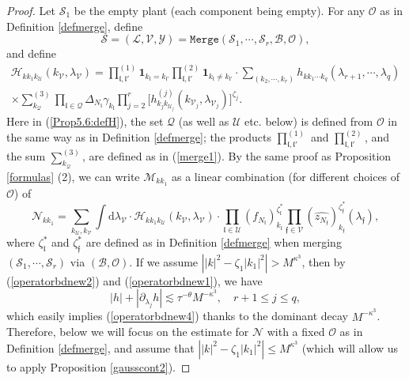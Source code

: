 \documentclass[11 pt,reqno]{amsart}
\theoremstyle{definition}
\theoremstyle{remark}
\numberwithin{equation}{section}
\newcommand{\Sc}{\mathcal{S}}
\newcommand{\Lc}{\mathcal{L}}
\newcommand{\Qc}{\mathcal{Q}}
\newcommand{\Uc}{\mathcal{U}}
\newcommand{\Vc}{\mathcal{V}}
\newcommand{\Yc}{\mathcal{Y}}
\newcommand{\Hc}{\mathcal{H}}
\newcommand{\ff}{\mathfrak{f}}
\newcommand{\lf}{\mathfrak{l}}
\newcommand{\Bs}{\mathscr{B}}
\newcommand{\Ms}{\mathscr{M}}
\newcommand{\Ns}{\mathscr{N}}
\newcommand{\Os}{\mathscr{O}}
\begin{document}
{\begin{proof}
Let $\Sc_1$ be the empty plant (each component being empty). For any $\Os$ as in Definition \ref{defmerge}, define 
\begin{equation*}\Sc=(\Lc,\Vc,\Yc)=\mathtt{Merge}(\Sc_1,\cdots,\Sc_r,\Bs,\Os),\end{equation*} and define
 \begin{multline}\label{Prop5.6:defH}
\Hc_{kk_1k_{\Uc}} (k_{\Vc}, \lambda_{\Vc})=\prod_{\lf,\lf'}^{(1)}\mathbf{1}_{k_\lf=k_{\lf'}}\prod_{\lf,\lf'}^{(2)}\mathbf{1}_{k_\lf\neq k_{\lf'}}\cdot\sum_{(k_2,\cdots,k_{r})}h_{kk_1\cdots k_q}(\lambda_{r+1},\cdots,\lambda_q)\\\times\sum_{k_{\Qc}}^{(3)}\prod_{\lf\in\Qc}\Delta_{N_\lf}\gamma_{k_\lf}\prod_{j=2}^{r}\big[h_{k_jk_{\Uc_j}}^{(j)}(k_{\Vc_j}, \lambda_{\Vc_j})\big]^{\zeta_j}.
\end{multline} Here in (\ref{Prop5.6:defH}), the set $\Qc$ (as well as $\Uc$ etc. below) is defined from $\Os$ in the same way as in Definition \ref{defmerge}; the products $\prod_{\lf,\lf'}^{(1)}$ and $\prod_{\lf,\lf'}^{(2)}$, and the sum $\sum_{k_{\Qc}}^{(3)}$, are defined as in (\ref{merge1}). By the same proof as Proposition \ref{formulas} (2), we can write $\Ms_{kk_1}$ as a linear combination (for different choices of $\Os$) 
of
 \begin{equation}\label{Prop5.6:M}
 \Ns_{kk_1}=\sum_{k_\Uc,k_\Vc}\int\mathrm{d}\lambda_\Vc\cdot \Hc_{kk_1 k_\Uc}(k_\Vc,\lambda_\Vc)\cdot\prod_{\lf\in\Uc}(f_{N_\lf})_{k_\lf}^{\zeta_\lf^*}\prod_{\ff\in\Vc}(\widehat{z_{N_\ff}})_{k_\ff}^{\zeta_\ff^*}(\lambda_\ff),
 \end{equation} 
 where $\zeta_\lf^*$ and $\zeta_\ff^*$ are defined as in Definition \ref{defmerge} when merging $(\Sc_1,\cdots,\Sc_r)$ via $(\Bs,\Os)$. If we assume $\left||k|^2-\zeta_1|k_1|^2\right|> M^{\kappa^3}$, then by (\ref{operatorbdnew2}) and (\ref{operatorbdnew1}), we have 
\[
|h|+|\partial_{\lambda_j} h|\lesssim \tau^{-\theta} M^{-\kappa^3}, \quad r+1\leq j\leq q,
\]
which easily implies (\ref{operatorbdnew4}) thanks to the dominant decay $M^{-\kappa^3}$. Therefore, below we will focus on the estimate for $\Ns$ with a fixed $\Os$ as in Definition \ref{defmerge}, and assume that $\left||k|^2-\zeta_1|k_1|^2\right|\leq M^{\kappa^3}$ (which will allow us to apply Proposition \ref{gausscont2}).


\end{proof}}
\end{document}
